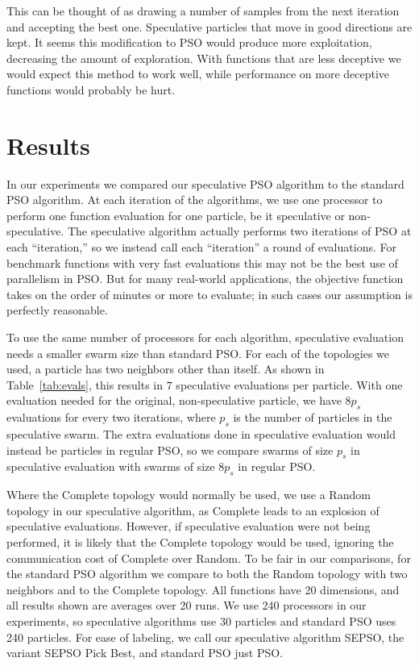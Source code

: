 \documentclass[letterpaper]{sig-alt-release2}
\begin{document}
This can be thought of as drawing a number of samples from the next iteration
and accepting the best one.  Speculative particles that move in good directions
are kept.  It seems this modification to PSO would produce more exploitation,
decreasing the amount of exploration.  With functions that are less deceptive
we would expect this method to work well, while performance on more deceptive
functions would probably be hurt.

\section{Results}
\label{sec:results}

In our experiments we compared our speculative PSO algorithm to the standard
PSO algorithm.  At each iteration of the algorithms, we use one processor to
perform one function evaluation for one particle, be it speculative or
non-speculative.  The speculative algorithm actually performs two iterations of
PSO at each ``iteration,'' so we instead call each ``iteration'' a round of
evaluations.  For benchmark functions with very fast evaluations this may not
be the best use of parallelism in PSO.  But for many real-world applications,
the objective function takes on the order of minutes or more to evaluate; in
such cases our assumption is perfectly reasonable.

To use the same number of processors for each algorithm, speculative evaluation
needs a smaller swarm size than standard PSO.  For each of the topologies we
used, a particle has two neighbors other than itself.  As shown in
Table~\ref{tab:evals}, this results in $7$ speculative evaluations per
particle.  With one evaluation needed for the original, non-speculative
particle, we have $8p_s$ evaluations for every two iterations, where $p_s$ is
the number of particles in the speculative swarm.  The extra evaluations done
in speculative evaluation would instead be particles in regular PSO, so we
compare swarms of size $p_s$ in speculative evaluation with swarms of size
$8p_s$ in regular PSO.

Where the Complete topology would normally be used, we use a Random topology in
our speculative algorithm, as Complete leads to an explosion of speculative
evaluations.  However, if speculative evaluation were not being performed, it
is likely that the Complete topology would be used, ignoring the communication
cost of Complete over Random.  To be fair in our comparisons, for the standard
PSO algorithm we compare to both the Random topology with two neighbors and to
the Complete topology.  All functions have 20 dimensions, and all results shown
are averages over 20 runs.  We use 240 processors in our experiments, so
speculative algorithms use 30 particles and standard PSO uses 240 particles.
For ease of labeling, we call our speculative algorithm SEPSO, the variant
SEPSO Pick Best, and standard PSO just PSO.
\end{document}
